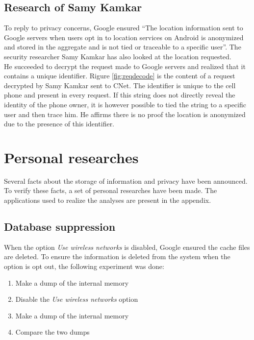\subsection{Research of Samy Kamkar}
\label{sec:andro-samy}

To reply to privacy concerns, Google ensured ``The location information sent to Google servers when users opt in to location services on Android is anonymized and stored in the aggregate and is not tied or traceable to a specific user''\cite{loc-not-traceable}.
The security researcher Samy Kamkar has also looked at the location requested.\\


He succeeded to decrypt the request made to Google servers and realized that it contains a unique identifier\cite{cnet-andr-samy}.
Rigure \ref{fig:reqdecode} is the content of a request decrypted by Samy Kamkar sent to CNet.
The identifier is unique to the cell phone and present in every request.
If this string does not directly reveal the identity of the phone owner, it is however possible to tied the string to a specific user and then trace him.
He affirms there is no proof the location is anonymized due to the presence of this identifier.\\

\section{Personal researches}
Several facts about the storage of information and privacy have been announced.
To verify these facts, a set of personal researches have been made.
The applications used to realize the analyses are present in the appendix.

\subsection{Database suppression}
When the option \emph{Use wireless networks} is disabled, Google ensured the cache files are deleted.
To ensure the information is deleted from the system when the option is opt out, the following experiment was done:

\begin{enumerate}
\item Make a dump of the internal memory
\item Disable the \emph{Use wireless networks} option
\item Make a dump of the internal memory
\item Compare the two dumps
\end{enumerate}

